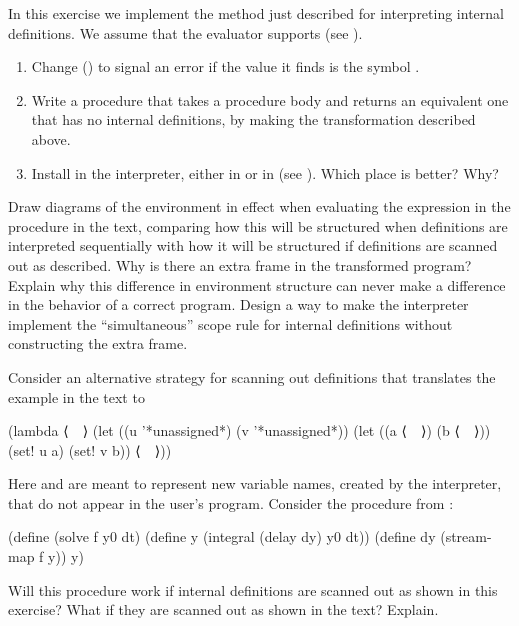 \begin{exercise}
	\label{Exercise 4.16}
	In this exercise we implement the method just described for interpreting internal definitions.
	We assume that the evaluator supports  (see ).
	\begin{enumerate}[label = \alph*., leftmargin = *]

		\item
			Change  () to signal an error if the value it finds is the symbol .

		\item
			Write a procedure  that takes a procedure body and returns an equivalent one that has no internal definitions, by making the transformation described above.

		\item
			Install  in the interpreter, either in  or in  (see ).
			Which place is better?
			Why?

	\end{enumerate}
\end{exercise}



\begin{exercise}
	\label{Exercise 4.17}
	Draw diagrams of the environment in effect when evaluating the expression  in the procedure in the text, comparing how this will be structured when definitions are interpreted sequentially with how it will be structured if definitions are scanned out as described.
	Why is there an extra frame in the transformed program?
	Explain why this difference in environment structure can never make a difference in the behavior of a correct program.
	Design a way to make the interpreter implement the “simultaneous” scope rule for internal definitions without constructing the extra frame.
\end{exercise}



\begin{exercise}
	\label{Exercise 4.18} Consider an alternative strategy for scanning out definitions that translates the example in the text to
	\begin{scheme}
	  (lambda ⟨~~⟩
	    (let ((u '*unassigned*) (v '*unassigned*))
	      (let ((a ⟨~~⟩) (b ⟨~~⟩))
	        (set! u a)
	        (set! v b))
	      ⟨~~⟩))
	\end{scheme}
	Here  and  are meant to represent new variable names, created by the interpreter, that do not appear in the user’s program.
	Consider the  procedure from \link{Section 3.5.4}:
	\begin{scheme}
	  (define (solve f y0 dt)
	    (define  y (integral (delay dy) y0 dt))
	    (define dy (stream-map f y))
	    y)
	\end{scheme}
	Will this procedure work if internal definitions are scanned out as shown in this exercise?
	What if they are scanned out as shown in the text?
	Explain.
\end{exercise}



